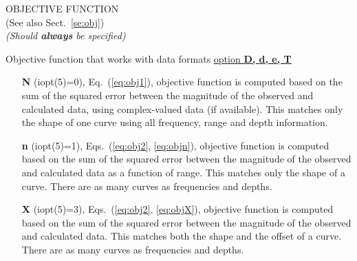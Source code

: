 \documentclass{saclantc}
\begin{document}
\noindent OBJECTIVE FUNCTION\\
(See also Sect.~\ref{se:obj})\\
{\it (Should {\bf always} be specified)}

Objective function that works with data formats \underline{option {\bf
D, d, e, T}}
\vspace{-0.6cm}
\begin{itemize}
    \item[{\bf N}] (iopt(5)=0), Eq.\ (\ref{eq:obj1}), objective function is computed based on 
  the sum of the  squared error between the magnitude of the observed and
calculated data, using complex-valued data (if available).
This matches only the shape of one curve using all frequency, range and
depth information.
\vspace{-0.3cm}
    \item[{\bf n}] (iopt(5)=1), Eqs.\ (\ref{eq:obj2}, \ref{eq:objn}),  objective function is computed based on 
  the sum of the  squared error between the magnitude of the observed and
calculated data as a function of range.
This matches only the shape of a curve. 
There are as many curves as frequencies and depths.
\vspace{-0.3cm}
    \item[{\bf X}] (iopt(5)=3),  Eqs.\ (\ref{eq:obj2}, \ref{eq:objX}),  objective function is computed
based on 
   the sum of the  squared error between the magnitude of the observed and calculated data.
    This matches both the shape and the offset of a curve.
There are as many curves as frequencies and depths.
\end{itemize}
\end{document}

